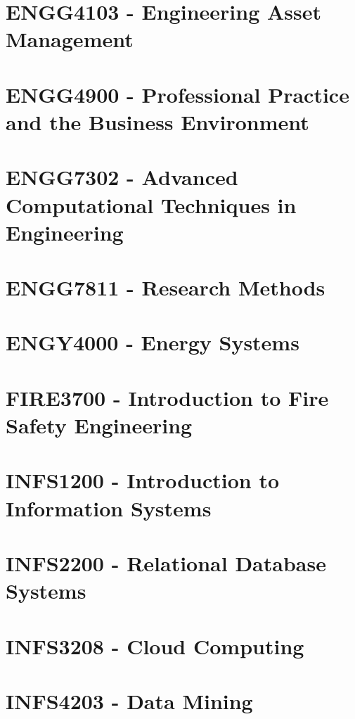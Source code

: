 \documentclass[a4paper,12pt]{report}
\begin{document}
\hypertarget{ENGG4103}{\section{ENGG4103 - Engineering Asset Management}}

\hypertarget{ENGG4900}{\section{ENGG4900 - Professional Practice and the Business Environment}}

\hypertarget{ENGG7302}{\section{ENGG7302 - Advanced Computational Techniques in Engineering}}

\hypertarget{ENGG7811}{\section{ENGG7811 - Research Methods}}

\hypertarget{ENGY4000}{\section{ENGY4000 - Energy Systems}}

\hypertarget{FIRE3700}{\section{FIRE3700 - Introduction to Fire Safety Engineering}}

\hypertarget{INFS1200}{\section{INFS1200 - Introduction to Information Systems}}

\hypertarget{INFS2200}{\section{INFS2200 - Relational Database Systems}}

\hypertarget{INFS3208}{\section{INFS3208 - Cloud Computing}}

\hypertarget{INFS4203}{\section{INFS4203 - Data Mining}}
\end{document}
